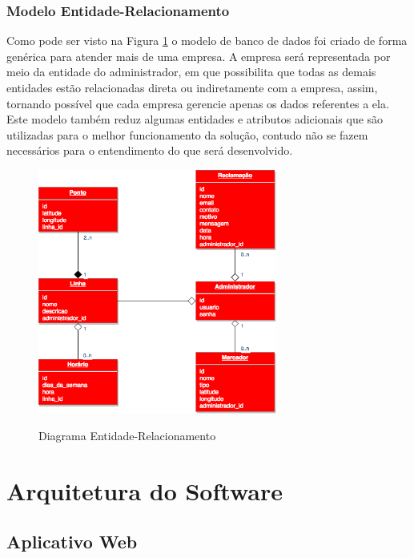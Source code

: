 {{{{\subsubsection{Modelo Entidade-Relacionamento}

Como pode ser visto na Figura \ref{fig:modelo-entidade-e-relacionamento} o modelo de banco de dados foi criado de forma genérica para atender mais de uma empresa. A empresa será representada por meio da entidade do administrador, em que possibilita que todas as demais entidades estão relacionadas direta ou indiretamente com a empresa, assim, tornando possível que cada empresa gerencie apenas os dados referentes a ela. Este modelo também reduz algumas entidades e atributos adicionais que são utilizadas para o melhor funcionamento da solução, contudo não se fazem necessários para o entendimento do que será desenvolvido.

\begin{figure}[H]
\caption{Diagrama Entidade-Relacionamento}
\centering
\includegraphics[width=0.7\textwidth]{imagens/modelo-entidade-e-relacionamento.png}
\label{fig:modelo-entidade-e-relacionamento}
\end{figure}

\section{Arquitetura do Software}

\subsection{Aplicativo Web}

}}}}

